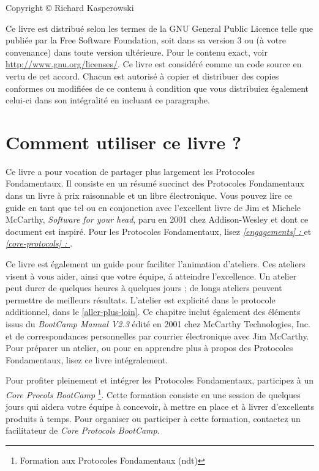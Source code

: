 \documentclass[11pt]{book}
\newcommand*{\numref}[1]{{\hyperref[{#1}]{\autoref*{#1}}}}
\newcommand*{\fullref}[1]{\textit{\hyperref[{#1}]{\autoref*{#1} : \nameref*{#1}}}}
\begin{document}
Copyright \copyright{} Richard Kasperowski

Ce livre est distribué selon les termes de la GNU General Public Licence telle que publiée par la Free Software
Foundation, soit dans sa version 3 ou (à votre convenance) dans toute version ultérieure. Pour le contenu exact, voir
\url{http://www.gnu.org/licenses/}. Ce livre est considéré comme un code source en vertu de cet accord. Chacun est autorisé
à copier et distribuer des copies conformes ou modifiées de ce contenu à condition que vous distribuiez également celui-ci
dans son intégralité en incluant ce paragraphe.

\mainmatter

\chapter{Comment utiliser ce livre ?} \label{utiliser-ce-livre}

Ce livre a pour vocation de partager plus largement les Protocoles Fondamentaux. Il consiste en un résumé succinct des
Protocoles Fondamentaux dans un livre à prix raisonnable et un libre électronique. Vous pouvez lire ce guide en tant que
tel ou en conjonction avec l'excellent livre de Jim et Michele McCarthy, \emph{Software for your head}, paru en 2001
chez Addison-Wesley et dont ce document est inspiré. Pour les Protocoles Fondamentaux, lisez \fullref{engagements} et
\fullref{core-protocols}.

Ce livre est également un guide pour faciliter l'animation d'ateliers. Ces ateliers visent à vous aider, ainsi que
votre équipe, á atteindre l'excellence. Un atelier peut durer de quelques heures à quelques jours ; de longs ateliers
peuvent permettre de meilleurs résultats. L'atelier est explicité dans le protocole additionnel, 
dans le \numref{aller-plus-loin}. Ce chapitre inclut également des éléments issus du \emph{BootCamp Manual V2.3} édité en
2001 chez McCarthy Technologies, Inc. et de correspondances personnelles par courrier électronique avec Jim McCarthy. Pour
préparer un atelier, ou pour en apprendre plus à propos des Protocoles Fondamentaux, lisez ce livre intégralement.

Pour profiter pleinement et intégrer les Protocoles Fondamentaux, participez à un \emph{Core Procols BootCamp}
\footnote{Formation aux Protocoles Fondamentaux (ndt)}. Cette formation consiste en une session de quelques jours qui aidera
votre équipe à concevoir, à mettre en place et à livrer d'excellents produits à temps. Pour organiser ou participer à cette
formation, contactez un facilitateur de \emph{Core Protocols BootCamp}.
\end{document}
